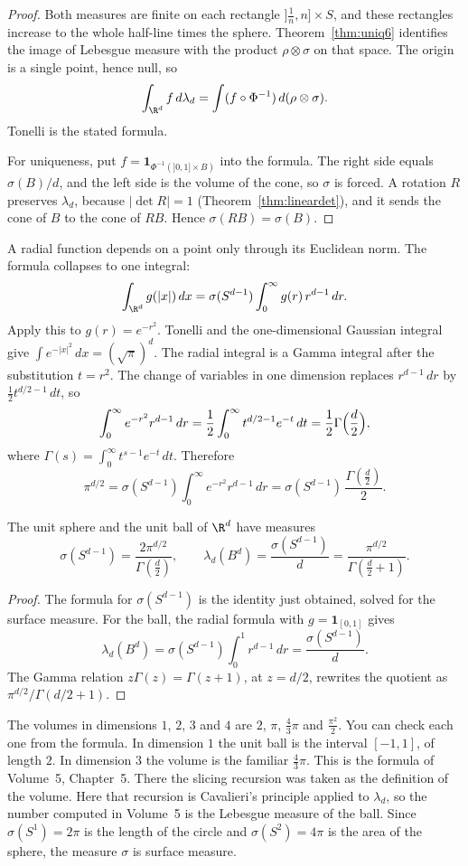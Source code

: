 \begin{proof}
Both measures are finite on each rectangle $]\frac1n,n]\times S$, and these rectangles increase to the whole half-line times the sphere. Theorem~\ref{thm:uniq6} identifies the image of Lebesgue measure with the product $\rho\otimes\sigma$ on that space. The origin is a single point, hence null, so
\[
\int_{\R^d}f\,d\lambda_d=\int(f\circ\Phi^{-1})\,d(\rho\otimes\sigma).
\]
Tonelli is the stated formula.

For uniqueness, put $f=\mathbf 1_{\Phi^{-1}(]0,1]\times B)}$ into the formula. The right side equals $\sigma(B)/d$, and the left side is the volume of the cone, so $\sigma$ is forced. A rotation $R$ preserves $\lambda_d$, because $|\det R|=1$ (Theorem~\ref{thm:lineardet}), and it sends the cone of $B$ to the cone of $RB$. Hence $\sigma(RB)=\sigma(B)$.
\end{proof}

A radial function depends on a point only through its Euclidean norm. The formula collapses to one integral:
\[
\int_{\R^d}g(|x|)\,dx=\sigma(S^{d-1})\int_0^\infty g(r)\,r^{d-1}\,dr.
\]
Apply this to $g(r)=e^{-r^2}$. Tonelli and the one-dimensional Gaussian integral give $\int e^{-|x|^2}\,dx=(\sqrt\pi)^d$. The radial integral is a Gamma integral after the substitution $t=r^2$. The change of variables in one dimension replaces $r^{d-1}\,dr$ by $\frac12 t^{d/2-1}\,dt$, so
\[
\int_0^\infty e^{-r^2}r^{d-1}\,dr=\frac12\int_0^\infty t^{d/2-1}e^{-t}\,dt=\frac12\Gamma\Bigl(\frac d2\Bigr),
\]
where $\Gamma(s)=\int_0^\infty t^{s-1}e^{-t}\,dt$. Therefore
\[\pi^{d/2}=\sigma(S^{d-1})\int_0^\infty e^{-r^2}r^{d-1}\,dr=\sigma(S^{d-1})\,\frac{\Gamma(\frac d2)}2.\]

\begin{theorem}\label{thm:ball}
The unit sphere and the unit ball of $\R^d$ have measures
\[\sigma(S^{d-1})=\frac{2\pi^{d/2}}{\Gamma(\frac d2)},\qquad\lambda_d(B^d)=\frac{\sigma(S^{d-1})}d=\frac{\pi^{d/2}}{\Gamma(\frac d2+1)}.\]
\end{theorem}
\begin{proof}
The formula for $\sigma(S^{d-1})$ is the identity just obtained, solved for the surface measure. For the ball, the radial formula with $g=\mathbf 1_{[0,1]}$ gives
\[
\lambda_d(B^d)=\sigma(S^{d-1})\int_0^1 r^{d-1}\,dr=\frac{\sigma(S^{d-1})}d.
\]
The Gamma relation $z\Gamma(z)=\Gamma(z+1)$, at $z=d/2$, rewrites the quotient as $\pi^{d/2}/\Gamma(d/2+1)$.
\end{proof}

The volumes in dimensions $1$, $2$, $3$ and $4$ are $2$, $\pi$, $\frac43\pi$ and $\frac{\pi^2}2$. You can check each one from the formula. In dimension $1$ the unit ball is the interval $[-1,1]$, of length $2$. In dimension $3$ the volume is the familiar $\frac43\pi$. This is the formula of Volume~5, Chapter~5. There the slicing recursion was taken as the definition of the volume. Here that recursion is Cavalieri's principle applied to $\lambda_d$, so the number computed in Volume~5 is the Lebesgue measure of the ball. Since $\sigma(S^1)=2\pi$ is the length of the circle and $\sigma(S^2)=4\pi$ is the area of the sphere, the measure $\sigma$ is surface measure.


